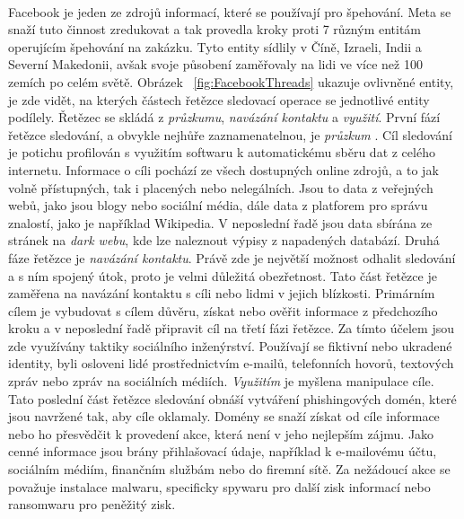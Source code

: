 ~

Facebook je jeden ze zdrojů informací, které se používají pro špehování.
Meta se snaží tuto činnost zredukovat a tak provedla kroky proti 7 různým entitám operujícím špehování na zakázku.
Tyto entity sídlily v Číně, Izraeli, Indii a Severní Makedonii, avšak svoje působení zaměřovaly na lidi ve více než 100 zemích po celém světě.
Obrázek ~\ref{fig:FacebookThreads} ukazuje ovlivněné entity, je zde vidět, na kterých částech řetězce sledovací operace se jednotlivé entity podílely.
Řetězec se skládá z \textit{průzkumu}, \textit{navázání kontaktu} a \textit{využití}.
První fází řetězce sledování, a obvykle nejhůře zaznamenatelnou, je \textit{průzkum} .
Cíl sledování je potichu profilován s využitím softwaru k automatickému sběru dat z celého internetu.
Informace o cíli pochází ze všech dostupných online zdrojů, a to jak volně přístupných, tak i placených nebo nelegálních.
Jsou to data z veřejných webů, jako jsou blogy nebo sociální média, dále data z platforem pro správu znalostí, jako je například Wikipedia.
V neposlední řadě jsou data sbírána ze stránek na \textit{dark webu}, kde lze naleznout výpisy z napadených databází.
Druhá fáze řetězce je \textit{navázání kontaktu}.
Právě zde je největší možnost odhalit sledování a s ním spojený útok, proto je velmi důležitá obezřetnost.
Tato část řetězce je zaměřena na navázání kontaktu s cíli nebo lidmi v jejich blízkosti.
Primárním cílem je vybudovat s cílem důvěru, získat nebo ověřit informace z předchozího kroku a v neposlední řadě připravit cíl na třetí fázi řetězce.
Za tímto účelem jsou zde využívány taktiky sociálního inženýrství.
Používají se fiktivní nebo ukradené identity, byli osloveni lidé prostřednictvím e-mailů, telefonních hovorů, textových zpráv nebo zpráv na sociálních médiích.
\textit{Využitím} je myšlena manipulace cíle.
Tato poslední část řetězce sledování obnáší vytváření phishingových domén, které jsou navržené tak, aby cíle oklamaly.
Domény se snaží získat od cíle informace nebo ho přesvědčit k provedení akce, která není v jeho nejlepším zájmu.
Jako cenné informace jsou brány přihlašovací údaje, například k e-mailovému účtu, sociálním médiím, finančním službám nebo do firemní sítě.
Za nežádoucí akce se považuje instalace malwaru, specificky spywaru pro další zisk informací nebo ransomwaru pro peněžitý zisk.\cite{pegasus_facebook}

